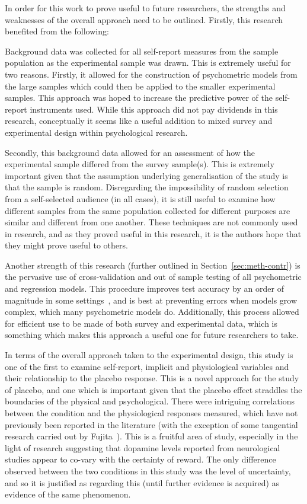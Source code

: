 In order for this work to prove useful to future researchers, the
strengths and weaknesses of the overall approach need to be outlined.
Firstly, this research benefited from the following:


Background data was collected for all self-report measures from the
sample population as the experimental sample was drawn. This is
extremely useful for two reasons. Firstly, it allowed for the
construction of psychometric models from the large samples which could
then be applied to the smaller experimental samples. This approach was
hoped to increase the predictive power of the self-report instruments
used. While this approach did not pay dividends in this research,
conceptually it seems like a useful addition to mixed survey and
experimental design within psychological research.

Secondly, this background data allowed for an assessment of how the
experimental sample differed from the survey sample(s). This is
extremely important given that the assumption underlying
generalisation of the study is that the sample is random. Disregarding
the impossibility of random selection from a self-selected audience
(in all cases), it is still useful to examine how different samples
from the same population collected for different purposes are similar
and different from one another. These techniques are not commonly used
in research, and as they proved useful in this research, it is the
authors hope that they might prove useful to others.

Another strength of this research (further outlined in
Section~\ref{sec:meth-contr}) is the pervasive use of cross-validation
and out of sample testing of all psychometric and regression models.
This procedure improves test accuracy by an order of magnitude in some
settings~\cite{friedman2009elements}, and is best at preventing errors
when models grow complex, which many psychometric models do.
Additionally, this process allowed for efficient use to be made of
both survey and experimental data, which is something which makes this
approach a useful one for future researchers to take.

In terms of the overall approach taken to the experimental design,
this study is one of the first to examine self-report, implicit and
physiological variables and their relationship to the placebo
response. This is a novel approach for the study of placebo, and one
which is important given that the placebo effect straddles the
boundaries of the physical and psychological. There were intriguing
correlations between the condition and the physiological responses
measured, which have not previously been reported in the literature
(with the exception of some tangential research carried out
by Fujita~\cite{Fujita2000}). This is a fruitful area of study, especially in
the light of research suggesting that dopamine levels reported from
neurological studies appear to co-vary with the certainty of reward.
The only difference observed between the two conditions in this study
was the level of uncertainty, and so it is justified as regarding this
(until further evidence is acquired) as evidence of the same
phenomenon.

